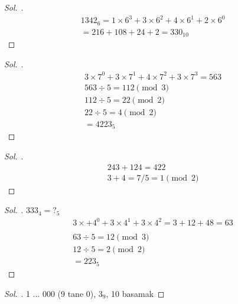 \documentclass{article}
\theoremstyle{mytheoremstyle}
\theoremstyle{mytheoremstyle}
\theoremstyle{myproblemstyle}
\begin{document}
\begin{proof}[\textit{ Sol. }]
  \begin{gather*}
    1342_6 = 1 \times 6^3 + 3 \times 6^2 + 4 \times 6^1 + 2 \times 6^0\\
    = 216 + 108 + 24 + 2 = 330_{10}
  \end{gather*}
\end{proof}

\begin{problem}[$ 1433_7 = ?_5 $]
\end{problem}

\begin{proof}[\textit{ Sol. }]
  \begin{gather*}
    3 \times 7^0 + 3 \times 7^1 + 4 \times 7^2 + 3 \times 7^3 = 563\\
    563 \div 5 = 112 \pmod 3\\
    112 \div 5 = 22 \pmod 2\\
    22 \div 5 = 4 \pmod 2\\
    = 4223_5
  \end{gather*}
\end{proof}

\begin{problem}[$ 243_5 + 124_5 = ? $]
\end{problem}

\begin{proof}[\textit{ Sol. }]
  \begin{gather*}
    243 + 124 = 422\\
    3 + 4 = 7 / 5 = 1 \pmod 2
  \end{gather*}
\end{proof}

\begin{problem}
\end{problem}

\begin{proof}[\textit{ Sol. }]
$ 333_4 = ?_5 $
  \begin{gather*}
    3 \times + 4^0 + 3 \times 4^1 + 3 \times 4^2 = 3 + 12 + 48 = 63\\\\
    63 \div 5 = 12 \pmod 3\\
    12 \div 5 = 2 \pmod 2\\
    = 223_5
  \end{gather*}
\end{proof}

\begin{problem}
\end{problem}

\begin{proof}[\textit{ Sol. }]
  1 ... 000 (9 tane 0), $3_9$, 10 basamak
\end{proof}
\end{document}
